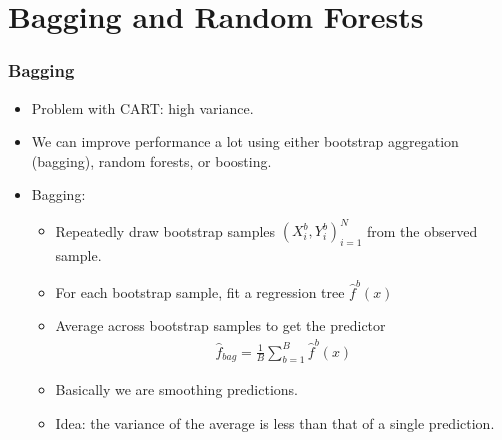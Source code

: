\documentclass[
  shownotes,
  xcolor={svgnames},
  hyperref={colorlinks,citecolor=DarkBlue,linkcolor=DarkRed,urlcolor=DarkBlue}
  , aspectratio=169]{beamer}
\begin{document}
\section{Bagging and Random Forests }
\begin{frame}[fragile]
\frametitle{Bagging}

\begin{itemize}
  \item Problem with CART: high variance.
  \item We can improve performance a lot using either bootstrap aggregation (bagging), random forests, or boosting.
  \item Bagging:
    \begin{itemize}
      \item Repeatedly draw bootstrap samples $(X_i^b,Y_i^b)_{i=1}^N$ from the observed sample.
      \item For each bootstrap sample, fit a regression tree $\hat{f}^b(x)$
      \item Average across bootstrap samples to get the predictor
      \begin{align}
        \hat{f}_{bag} =\frac{1}{B}\sum_{b=1}^B \hat{f}^b(x)
      \end{align}
\item Basically we are smoothing predictions. 
\item Idea: the variance of the average is less than that of a single prediction.
\end{itemize}

\end{itemize}

\end{frame}
\end{document}
